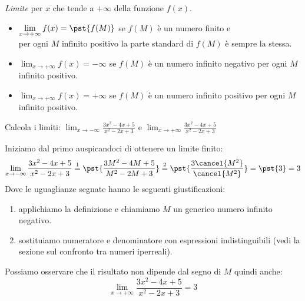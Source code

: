 \begin{definizione}
\emph{Limite} per \(x\) che tende a \(+\infty\) della funzione \(f(x)\).
\begin{itemize}
\item 
\(\displaystyle \lim_{x \to +\infty}f(x) = \pst{f(M)}\)
se \(f(M)\) è un numero finito e \\
per ogni \(M\) infinito positivo
la parte standard di \(f(M)\) è sempre la stessa.
\item 
\(\displaystyle \lim_{x \to +\infty}f(x) = -\infty\)
se \(f(M)\) è un numero infinito negativo 
per ogni \(M\) infinito positivo.
\item 
\(\displaystyle \lim_{x \to +\infty}f(x) = +\infty\)
se \(f(M)\) è un numero infinito positivo 
per ogni \(M\) infinito positivo.
\end{itemize}
\end{definizione}

\begin{esempio}
Calcola i limiti: 
\(\displaystyle \lim_{x \to -\infty}\frac{3x^2-4x+5}{x^2-2x+3}\)
\quad e \quad
\(\displaystyle \lim_{x \to +\infty}\frac{3x^2-4x+5}{x^2-2x+3}\)

Iniziamo dal primo auspicandoci di ottenere un limite finito:
\[\lim_{x \to -\infty}\frac{3x^2-4x+5}{x^2-2x+3} \stackrel{1}{=} 
\pst{\frac{3M^2-4M+5}{M^2-2M+3}} \stackrel{2}{=} 
\pst{\frac{3\cancel{M^2}}{\cancel{M^2}}} = \pst{3} = 3\]
Dove le uguaglianze segnate hanno le seguenti giustificazioni:
\begin{enumerate} [nosep]
\item applichiamo la definizione e chiamiamo \(M\) un generico numero 
infinito negativo.
\item sostituiamo numeratore e denominatore con espressioni indistinguibili 
(vedi la sezione sul confronto tra numeri iperreali).
\end{enumerate}
Possiamo osservare che il risultato non dipende dal segno di \(M\) quindi 
anche: 
\[\displaystyle \lim_{x \to +\infty}\frac{3x^2-4x+5}{x^2-2x+3} = 3\]
\begin{comment}
Per il numeratore: 
\(3M^2-4M+5 \sim 3M^2\) infatti: \\ [.5em]
\(\dfrac{3M^2-4M+5 - 3M^2}{3M^2} = \dfrac{-4M+5}{3M^2} = 
\dfrac{-4M}{3M^2} + \dfrac{+5}{3M^2} = 
\dfrac{-4}{3M} + \dfrac{+5}{3M^2} = \alpha + \beta \approx 0\) \\ [.5em]
e: \\ [.5em]
\(\dfrac{3M^2-4M+5 - 3M^2}{3M^2-4M+5} = 
\dfrac{\dfrac{-4M+5}{M}}{\dfrac{3M^2-4M+5}{M}} = 
\dfrac{\dfrac{-4M}{M}+\dfrac{+5}{M}}
      {\dfrac{3M^2}{M}+\dfrac{-4M}{M}+\dfrac{+5}{M}} = 
\dfrac{-4+\alpha}{3M-4+\beta} \stackrel{*}{\approx} 0\)\\ [.5em]
\(*\) Dato che il numeratore è un finito e il denominatore un infinito.
\\ [.5em]
In modo analogo si dimostra che \(M^2-2M+3 \approx M^2\)
\end{comment}
\begin{center} \limiteallinfinito \end{center}
\end{esempio}

